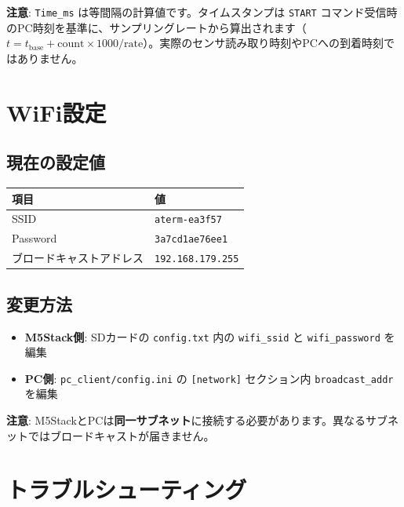 \documentclass[a4paper,10pt]{ltjsarticle}
\begin{document}
\textbf{注意}: \texttt{Time\_ms} は等間隔の計算値です。タイムスタンプは \texttt{START} コマンド受信時のPC時刻を基準に、サンプリングレートから算出されます（$t = t_{\mathrm{base}} + \mathrm{count} \times 1000 / \mathrm{rate}$）。実際のセンサ読み取り時刻やPCへの到着時刻ではありません。

\newpage

\section{WiFi設定}

\subsection{現在の設定値}

\begin{table}[h]
\centering
\begin{tabular}{ll}
\toprule
\textbf{項目} & \textbf{値} \\
\midrule
SSID                  & \texttt{aterm-ea3f57} \\
Password              & \texttt{3a7cd1ae76ee1} \\
ブロードキャストアドレス & \texttt{192.168.179.255} \\
\bottomrule
\end{tabular}
\end{table}

\subsection{変更方法}

\begin{itemize}
  \item \textbf{M5Stack側}: SDカードの \texttt{config.txt} 内の \texttt{wifi\_ssid} と \texttt{wifi\_password} を編集
  \item \textbf{PC側}: \texttt{pc\_client/config.ini} の \texttt{[network]} セクション内 \texttt{broadcast\_addr} を編集
\end{itemize}

\textbf{注意}: M5StackとPCは\textbf{同一サブネット}に接続する必要があります。異なるサブネットではブロードキャストが届きません。

\newpage

\section{トラブルシューティング}
\end{document}
